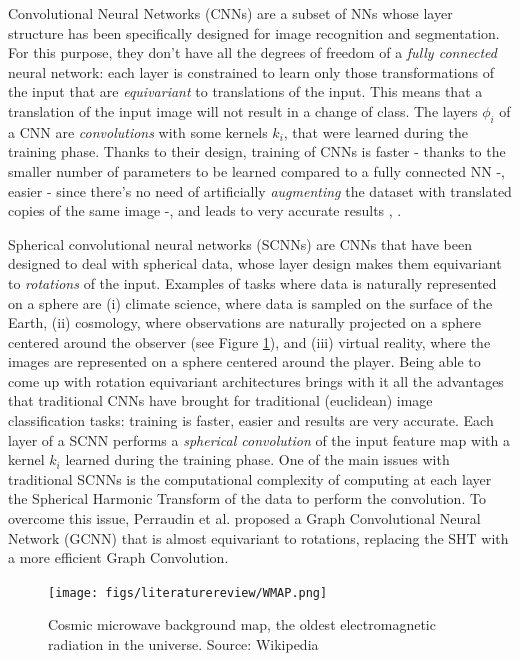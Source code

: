 Convolutional Neural Networks (CNNs) are a subset of NNs whose layer structure has been specifically designed for image recognition and segmentation. For this purpose, they don't have all the degrees of freedom of a \textit{fully connected} neural network: each layer is constrained to learn only those transformations of the input that are \textit{equivariant} to translations of the input. This means that a translation of the input image will not result in a change of class. The layers $\phi_i$ of a CNN are \textit{convolutions} with some kernels $k_i$, that were learned during the training phase. Thanks to their design, training of CNNs is faster - thanks to the smaller number of parameters to be learned compared to a fully connected NN -, easier - since there's no need of artificially \textit{augmenting} the dataset with translated copies of the same image -, and leads to very accurate results \cite{SCNN}, \cite{Esteves}.

Spherical convolutional neural networks (SCNNs) are CNNs that have been designed to deal with spherical data, whose layer design makes them equivariant to \textit{rotations} of the input.  Examples of tasks where data is naturally represented on a sphere are (i) climate science, where data is sampled on the surface of the Earth, (ii) cosmology, where observations are naturally projected on a sphere centered around the observer (see Figure \ref{fig:cosmicradiation}), and (iii) virtual reality, where the images are represented on a sphere centered around the player. Being able to come up with rotation equivariant architectures brings with it all the advantages that traditional CNNs have brought for traditional (euclidean) image classification tasks: training is faster, easier and results are very accurate. Each layer of a SCNN performs a \textit{spherical convolution} of the input feature map with a kernel $k_i$ learned during the training phase. One of the main issues with traditional SCNNs is the computational complexity of computing at each layer the Spherical Harmonic Transform of the data to perform the convolution. To overcome this issue, Perraudin et al. \cite{DeepSphere} proposed a Graph Convolutional Neural Network (GCNN) that is almost equivariant to rotations, replacing the SHT with a more efficient Graph Convolution.
\begin{figure}
	\centering
	\caption{\label{fig:cosmicradiation} Cosmic microwave background map, the oldest electromagnetic radiation in the universe. Source: Wikipedia}
	\texttt{[image: figs/literaturereview/WMAP.png]}
\end{figure}


